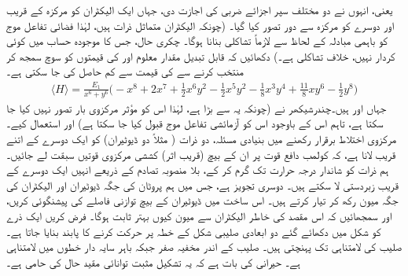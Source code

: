 یعنی، انہوں نے دو مختلف سپر اجزائے ضربی کی اجازت دی، جہاں ایک الیکٹران کو مرکزہ کے قریب اور دوسرے کو مرکزہ سے دور تصور کیا گیا۔ (چونکہ الیکٹران متماثل ذرات ہیں، لہٰذا فضائی تفاعل موج کو باہمی مبادلہ کے لحاظ سے لازماً تشاکلی بنانا ہوگا۔ چکری حال، جس کا موجودہ حساب میں کوئی کردار نہیں، خلاف تشاکلی ہے۔) دکھائیں کہ قابل تبدیل مقدار معلوم  اور  کی قیمتوں کو سوچ سمجھ کر منتخب کرنے سے  کی قیمت  سے کم حاصل کی جا سکتی ہے۔ 
\begin{align*}
\langle H \rangle = \frac{E_{1}}{x^{6}+y^{6}}\big(-x^{8}+2x^{7}+\frac{1}{2}x^{6}y^{2}-\frac{1}{2}x^{5}y^{2}-\frac{1}{8}x^{3}y^{4}+\frac{11}{8}xy^{6}-\frac{1}{2}y^{8}\big)
\end{align*}
 جہاں  اور  ہیں۔چندرشیکھر نے  (چونکہ یہ  سے بڑا ہے، لہٰذا اس کو مؤثر مرکزوی بار تصور نہیں کیا جا سکتا ہے، تاہم اس کے باوجود اس کو آزمائشی تفاعل موج قبول کیا جا سکتا ہے) اور  استعمال کیے۔
مرکزوی اختلاط برقرار رکھنے میں بنیادی مسئلہ، دو ذرات ( مثلاً دو ڈیوٹیران) کو ایک دوسرے کے اتنے قریب لانا ہے، کہ کولمب دافع قوت پر ان کے بیچ (قریب اثر) کششی مرکزوی قوتیں سبقت لے جائیں۔ ہم ذرات کو شاندار درجہ حرارت تک گرم کر کے، بلا منصوبہ تصادم کے ذریعے انہیں ایک دوسرے کے قریب زبردستی لا سکتے ہیں۔ دوسری تجویز  ہے، جس میں ہم پروٹان کی جگہ ڈیوٹیران اور الیکٹران کی جگہ میون رکھ کر  تیار کرتے ہیں۔ اس ساخت میں ڈیوٹیران کے بیچ توازنی فاصلے کی پیشنگوئی کریں، اور سمجھائیں کہ اس مقصد کی خاطر الیکٹران سے میون کیوں بہتر ثابت ہوگا۔
 
 فرض کریں ایک ذرے کو شکل  میں دکھائے گئے دو ابعادی صلیبی شکل کے خطہ پر حرکت کرنے کا پابند بنایا جاتا ہے۔ صلیب کی  لامتناہی تک پہنچتی ہیں۔ صلیب کے اندر مخفیہ صفر جبکہ باہر سایہ دار خطوں میں لامتناہی ہے۔ حیرانی کی بات ہے کہ یہ تشکیل مثبت توانائی مقید حال کی حامی ہے۔

